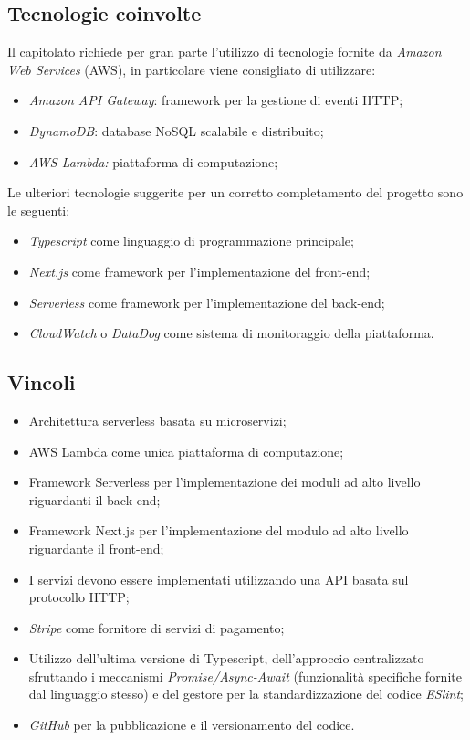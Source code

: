 \subsection{Tecnologie coinvolte}{
Il capitolato richiede per gran parte l'utilizzo di tecnologie fornite da \textit{Amazon Web Services} (AWS), in particolare viene consigliato di utilizzare:
\begin{itemize}
\item \textit{Amazon API Gateway}: framework per la gestione di eventi HTTP;
\item \textit{DynamoDB}: database NoSQL scalabile e distribuito;
\item \textit{AWS Lambda:} piattaforma di computazione;
\end{itemize}
Le ulteriori tecnologie suggerite per un corretto completamento del progetto sono le seguenti:
\begin{itemize}
\item \textit{Typescript} come linguaggio di programmazione principale;
\item \textit{Next.js} come framework per l'implementazione del front-end;
\item \textit{Serverless} come framework per l'implementazione del back-end;
\item \textit{CloudWatch} o \textit{DataDog} come sistema di monitoraggio della piattaforma.
\end{itemize}
}

\subsection{Vincoli}{
\begin{itemize}
\item Architettura serverless basata su microservizi;
\item AWS Lambda come unica piattaforma di computazione;
\item Framework Serverless per l'implementazione dei moduli ad alto livello riguardanti il back-end;
\item Framework Next.js per l'implementazione del modulo ad alto livello riguardante il front-end;
\item I servizi devono essere implementati utilizzando una API basata sul protocollo HTTP;
\item \textit{Stripe} come fornitore di servizi di pagamento;
\item Utilizzo dell'ultima versione di Typescript, dell'approccio centralizzato sfruttando i meccanismi \textit{Promise/Async-Await} (funzionalità specifiche fornite dal linguaggio stesso) e del gestore per la standardizzazione del codice \textit{ESlint};
\item \textit{GitHub} per la pubblicazione e il versionamento del codice.
\end{itemize}
}

